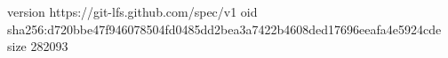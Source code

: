 version https://git-lfs.github.com/spec/v1
oid sha256:d720bbe47f946078504fd0485dd2bea3a7422b4608ded17696eeafa4e5924cde
size 282093
